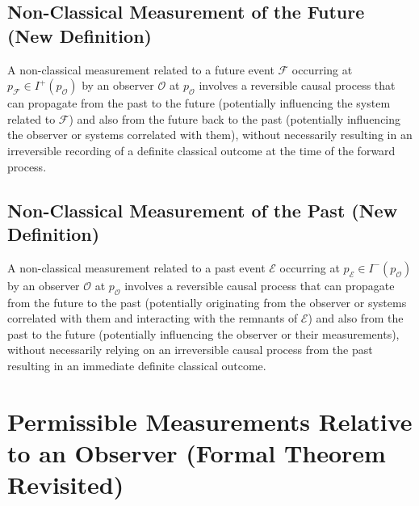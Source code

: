 	\subsection{Non-Classical Measurement of the Future (New Definition)}
	
	\begin{definition}
		A non-classical measurement related to a future event $\mathcal{F}$ occurring at $p_{\mathcal{F}} \in I^+(p_{\mathcal{O}})$ by an observer $\mathcal{O}$ at $p_{\mathcal{O}}$ involves a reversible causal process that can propagate from the past to the future (potentially influencing the system related to $\mathcal{F}$) and also from the future back to the past (potentially influencing the observer or systems correlated with them), without necessarily resulting in an irreversible recording of a definite classical outcome at the time of the forward process.
	\end{definition}
	
	\subsection{Non-Classical Measurement of the Past (New Definition)}
	
	\begin{definition}
		A non-classical measurement related to a past event $\mathcal{E}$ occurring at $p_{\mathcal{E}} \in I^-(p_{\mathcal{O}})$ by an observer $\mathcal{O}$ at $p_{\mathcal{O}}$ involves a reversible causal process that can propagate from the future to the past (potentially originating from the observer or systems correlated with them and interacting with the remnants of $\mathcal{E}$) and also from the past to the future (potentially influencing the observer or their measurements), without necessarily relying on an irreversible causal process from the past resulting in an immediate definite classical outcome.
	\end{definition}
	
	\section{Permissible Measurements Relative to an Observer (Formal Theorem Revisited)}
	
